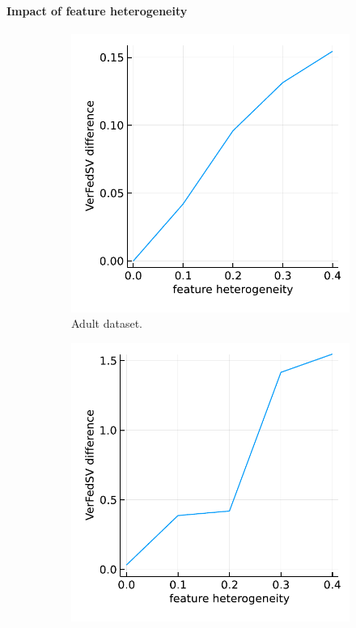 \paragraph{Impact of feature heterogeneity}
\begin{figure}[t]
\begin{subfigure}{.24\textwidth}
  \centering
  \includegraphics[width=\linewidth]{./figures/syn_similar_feature_adult.pdf}
  \caption{Adult dataset.}
  \label{fig:syn_similar_feature_adult}
\end{subfigure}%
\begin{subfigure}{.24\textwidth}
  \centering
  \includegraphics[width=\linewidth]{./figures/syn_similar_feature_web.pdf}

\end{subfigure}
\end{figure}
